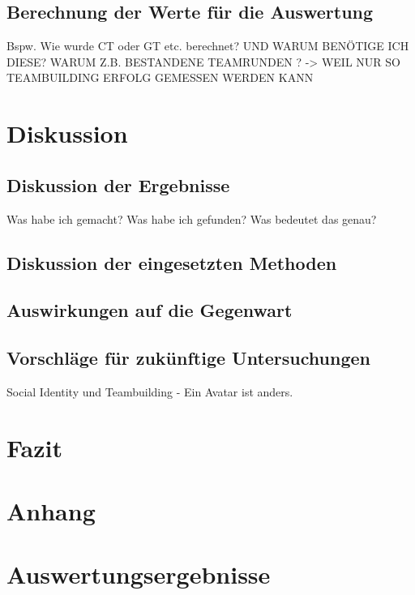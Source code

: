 \documentclass[a4paper,11pt]{article}%
\renewcommand{\\}{\vspace*{0.5\baselineskip} \newline}
\begin{document}
\subsection{Berechnung der Werte für die Auswertung}
Bspw. Wie wurde CT oder GT etc. berechnet? UND WARUM BENÖTIGE ICH DIESE? WARUM Z.B. BESTANDENE TEAMRUNDEN ? -> WEIL NUR SO TEAMBUILDING ERFOLG GEMESSEN WERDEN KANN
\newpage

\clearpage
\newpage

\section{Diskussion}
	\subsection{Diskussion der Ergebnisse}
	Was habe ich gemacht?
	Was habe ich gefunden? 
	Was bedeutet das genau?
	\subsection{Diskussion der eingesetzten Methoden}
	\subsection{Auswirkungen auf die Gegenwart}
	\subsection{Vorschläge für zukünftige Untersuchungen}
		Social Identity und Teambuilding - Ein Avatar ist anders.
	
\section{Fazit}
\newpage




	\newpage
	\appendix	
\section*{Anhang}

\section{Auswertungsergebnisse}
	
\end{document}
